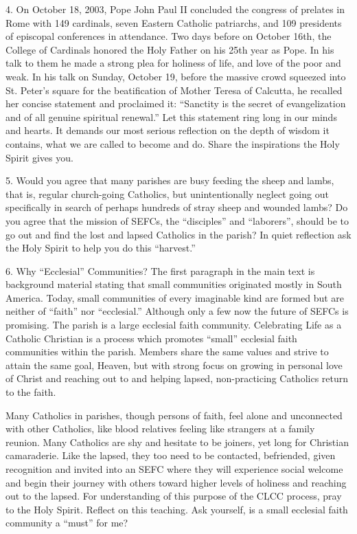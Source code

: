 \documentclass[oneside]{book}
\begin{document}
4. On October 18, 2003, Pope John Paul II concluded the congress of prelates in
Rome with 149 cardinals, seven Eastern Catholic patriarchs, and 109 presidents
of episcopal conferences in attendance. Two days before on October 16th, the
College of Cardinals honored the Holy Father on his 25th year as Pope. In his
talk to them he made a strong plea for holiness of life, and love of the poor
and weak. In his talk on Sunday, October 19, before the massive crowd squeezed
into St. Peter's square for the beatification of Mother Teresa of Calcutta, he
recalled her concise statement and proclaimed it: ``Sanctity is the secret of
evangelization and of all genuine spiritual renewal.''  Let this statement ring
long in our minds and hearts. It demands our most serious reflection on the
depth of wisdom it contains, what we are called to become and do. Share the
inspirations the Holy Spirit gives you.

5. Would you agree that many parishes are busy feeding the sheep and lambs, that
is, regular church-going Catholics, but unintentionally neglect going out
specifically in search of perhaps hundreds of stray sheep and wounded lambs? Do
you agree that the mission of SEFCs, the ``disciples'' and ``laborers'', should
be to go out and find the lost and lapsed Catholics in the parish? In quiet
reflection ask the Holy Spirit to help you do this ``harvest.''

6. Why ``Ecclesial'' Communities?
The first paragraph in the main text is background material stating that small
communities originated mostly in South America. Today, small communities of
every imaginable kind are formed but are neither of ``faith'' nor ``ecclesial.''
Although only a few now the future of SEFCs is promising. The parish is a large
ecclesial faith community. Celebrating Life as a Catholic Christian is a process
which promotes ``small'' ecclesial faith communities within the parish.  Members
share the same values and strive to attain the same goal, Heaven, but with
strong focus on growing in personal love of Christ and reaching out to and
helping lapsed, non-practicing Catholics return to the faith.

Many Catholics in parishes, though persons of faith, feel alone and unconnected
with other Catholics, like blood relatives feeling like strangers at a family
reunion. Many Catholics are shy and hesitate to be joiners, yet long for
Christian camaraderie. Like the lapsed, they too need to be contacted,
befriended, given recognition and invited into an SEFC where they will
experience social welcome and begin their journey with others toward higher
levels of holiness and reaching out to the lapsed. For understanding of this
purpose of the CLCC process, pray to the Holy Spirit. Reflect on this
teaching. Ask yourself, is a small ecclesial faith community a ``must'' for me?
\end{document}
